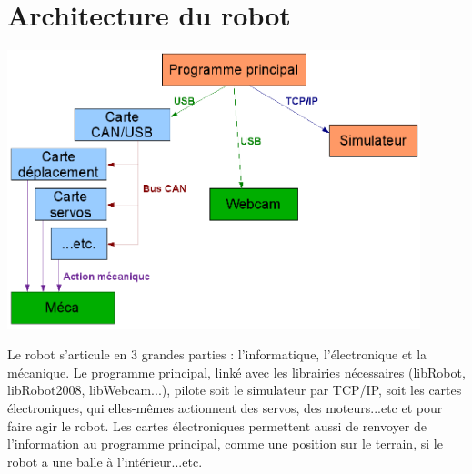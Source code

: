 
\section{Architecture du robot}

\begin{center}
\includegraphics[width=12cm]{images/architecture_1.png}\\
\end{center}
\indent Le robot s'articule en 3 grandes parties : l'informatique, l'électronique et la mécanique. Le programme principal, linké avec les librairies nécessaires (libRobot, libRobot2008, libWebcam...), pilote soit le simulateur par TCP/IP, soit les cartes électroniques, qui elles-mêmes actionnent des servos, des moteurs...etc et pour faire agir le robot. Les cartes électroniques permettent aussi de renvoyer de l'information au programme principal, comme une position sur le terrain, si le robot a une balle à l'intérieur...etc.\\

